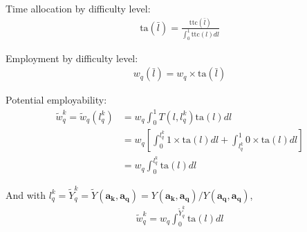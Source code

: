 \documentclass[hidelinks, nonatbib]{elsarticle}
\begin{document}


Time allocation by difficulty level:
\begin{gather}
    \text{ta}(\bar{l}) = 
    \frac{
        \text{ttc}(\bar{l})
    }{
        \int_{0}^{1}{
            \text{ttc}(l)
            dl
        }
    }
\end{gather}

Employment by difficulty level:
\begin{gather}
    w_q(\bar{l}) = 
    w_q 
    \times
    \text{ta}(\bar{l})
\end{gather}

Potential employability:
\begin{align}
    \tilde{w}_{q}^{k} =
    \tilde{w}_q(l_{q}^{k}) &=
    w_q
    \int_{0}^{1}
    T(l, l_{q}^{k})
    \text{ta}(l)
    dl
    \\
    &=
    w_q
    \left[
        \int_{0}^{l_{q}^{k}}
            1 \times
            \text{ta}(l)
            dl
        + 
        \int_{l_{q}^{k}}^{1}
            0 \times
            \text{ta}(l)
            dl
    \right]
    \\
    &=
    w_q
    \int_{0}^{l_{q}^{k}}
    \text{ta}(l)
    dl
\end{align}

And with $
l_{q}^{k}
= \tilde{Y}_{q}^{k}
= \tilde{Y}(\boldsymbol{a_k}, \boldsymbol{a_q})
= Y(\boldsymbol{a_k}, \boldsymbol{a_q}) / Y(\boldsymbol{a_q}, \boldsymbol{a_q})$,
\begin{gather}
    \tilde{w}_{q}^{k} =
    w_q
    \int_{0}^{\tilde{Y}_{q}^{k}}
    \text{ta}(l)
    dl
\end{gather}
\end{document}
